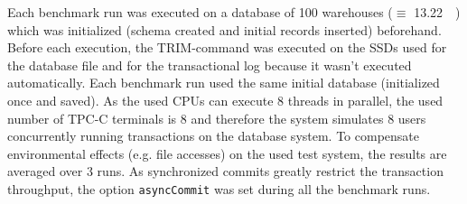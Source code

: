 	Each benchmark run was executed on a database of 100 warehouses ($\equiv$ \SI{13.22}{\gibi\byte}) which was initialized (schema created and initial records inserted) beforehand. Before each execution, the TRIM-command was executed on the SSDs used for the database file and for the transactional log because it wasn't executed automatically. Each benchmark run used the same initial database (initialized once and saved). As the used CPUs can execute 8 threads in parallel, the used number of TPC-C terminals is 8 and therefore the system simulates 8 users concurrently running transactions on the database system. To compensate environmental effects (e.g. file accesses) on the used test system, the results are averaged over 3 runs. As synchronized commits greatly restrict the transaction throughput, the option \lstinline{asyncCommit} was set during all the benchmark runs.

